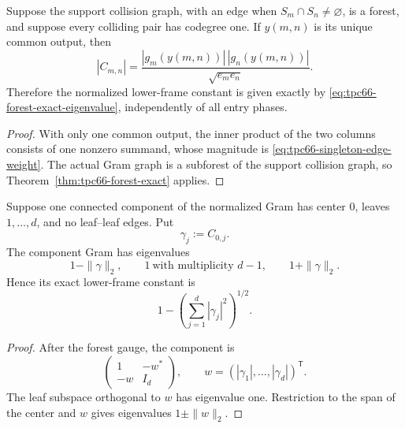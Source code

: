 \begin{corollary}
\label{cor:tpc66-support-forest-singleton}
Suppose the support collision graph, with an edge when
\(S_m\cap S_n\ne\varnothing\), is a forest, and suppose every colliding
pair has codegree one.  If \(y(m,n)\) is its unique common output, then
\begin{equation}
 |C_{m,n}|
 =
 \frac{|g_m(y(m,n))|\,|g_n(y(m,n))|}
      {\sqrt{e_me_n}}.
 \label{eq:tpc66-singleton-edge-weight}
\end{equation}
Therefore the normalized lower-frame constant is given exactly by
\eqref{eq:tpc66-forest-exact-eigenvalue}, independently of all entry
phases.
\end{corollary}

\begin{proof}
With only one common output, the inner product of the two columns consists
of one nonzero summand, whose magnitude is
\eqref{eq:tpc66-singleton-edge-weight}.  The actual Gram graph is a
subforest of the support collision graph, so
Theorem~\ref{thm:tpc66-forest-exact} applies.
\end{proof}

\begin{corollary}
\label{cor:tpc66-exact-star}
Suppose one connected component of the normalized Gram has center \(0\),
leaves \(1,\ldots,d\), and no leaf--leaf edges.  Put
\[
 \gamma_j:=C_{0,j}.
\]
The component Gram has eigenvalues
\begin{equation}
 1-\|\gamma\|_2,\qquad
 1\ \text{with multiplicity }d-1,\qquad
 1+\|\gamma\|_2.
 \label{eq:tpc66-star-spectrum}
\end{equation}
Hence its exact lower-frame constant is
\begin{equation}
 \boxed{
 1-\left(\sum_{j=1}^d|\gamma_j|^2\right)^{1/2}.}
 \label{eq:tpc66-star-lower-frame}
\end{equation}
\end{corollary}

\begin{proof}
After the forest gauge, the component is
\[
 \begin{pmatrix}
 1&-w^*\\
 -w&I_d
 \end{pmatrix},
 \qquad
 w=(|\gamma_1|,\ldots,|\gamma_d|)^{\mathsf T}.
\]
The leaf subspace orthogonal to \(w\) has eigenvalue one.  Restriction to
the span of the center and \(w\) gives eigenvalues
\(1\pm\|w\|_2\).
\end{proof}

